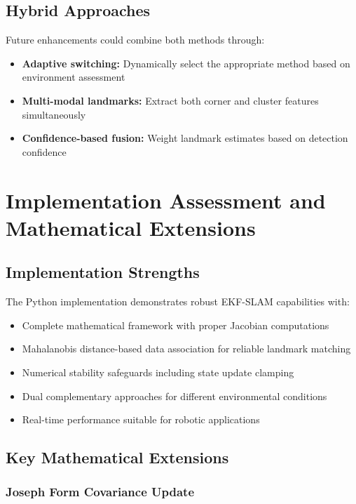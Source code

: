 \documentclass[12pt,a4paper]{article}
\begin{document}
\subsection{Hybrid Approaches}

Future enhancements could combine both methods through:
\begin{itemize}
    \item \textbf{Adaptive switching:} Dynamically select the appropriate method based on environment assessment
    \item \textbf{Multi-modal landmarks:} Extract both corner and cluster features simultaneously
    \item \textbf{Confidence-based fusion:} Weight landmark estimates based on detection confidence
\end{itemize}

\section{Implementation Assessment and Mathematical Extensions}

\subsection{Implementation Strengths}

The Python implementation demonstrates robust EKF-SLAM capabilities with:
\begin{itemize}
    \item Complete mathematical framework with proper Jacobian computations
    \item Mahalanobis distance-based data association for reliable landmark matching
    \item Numerical stability safeguards including state update clamping
    \item Dual complementary approaches for different environmental conditions
    \item Real-time performance suitable for robotic applications
\end{itemize}

\subsection{Key Mathematical Extensions}

\subsubsection{Joseph Form Covariance Update}
\end{document}
